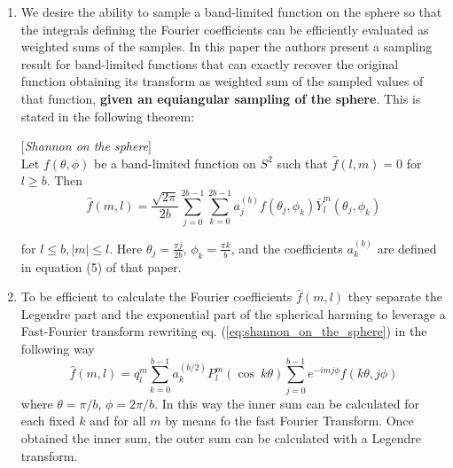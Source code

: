 \begin{enumerate}
\item We desire the ability to sample a band-limited function on the sphere so that the integrals defining the Fourier coefficients can be efficiently evaluated as weighted sums of the samples. In this paper the authors present a sampling result for band-limited functions that can exactly recover the original function obtaining its transform as weighted sum of the sampled values of that function, \textbf{given an equiangular sampling of the sphere}. This is stated in the following theorem:
\begin{theorem}{[\textit{Shannon on the sphere}]}\\
	Let $f(\theta, \phi)$ be a band-limited function on $S^2$ such that $\hat f(l,m) = 0$ for $l\geq b$. Then
	\begin{equation}
			\hat f(m,l) = \frac{\sqrt{2\pi}}{2b}\sum_{j=0}^{2b-1}\sum_{k=0}^{2b-1}a_j^{(b)}f(\theta_j, \phi_k)\bar Y_l^m(\theta_j, \phi_k)
			\label{eq:shannon_on_the_sphere}
	\end{equation}

	for $l\leq b, |m|\leq l$. Here $\theta_j = \frac{\pi j}{2b}$, $\phi_k = \frac{\pi k}{b}$, and the coefficients $a_k^{(b)}$ are defined in equation (5) of that paper.
\end{theorem} 

\item To be efficient to calculate the Fourier coefficients $\hat f(m,l)$ they separate the Legendre part and the exponential part  of the spherical harming to leverage a Fast-Fourier transform rewriting eq. (\ref{eq:shannon_on_the_sphere}) in the following way
\begin{equation}
		\hat f(m,l) = q^m_l\sum_{k=0}^{b-1}a_k^{(b/2)}P_l^m(\cos\ k\theta)\sum_{j=0}^{b-1} e^{-imj\phi}f(k\theta, j\phi)
\end{equation}
where $\theta = \pi/b$, $\phi = 2\pi/b$. In this way the inner sum can be calculated for each fixed $k$ and for all $m$ by means fo the fast Fourier Transform. Once obtained the inner sum, the outer sum can be calculated with a Legendre transform.
\end{enumerate}
